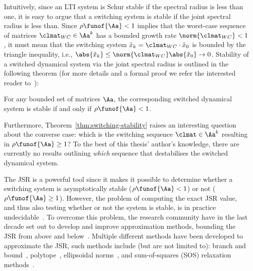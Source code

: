 Intuitively, since an LTI system is Schur stable if the spectral radius is less than one, it is easy to argue that a switching system is stable if the joint spectral radius is less than.
Since $\rho\funof{\Aa} < 1$ implies that the worst-case sequence of matrices $\clmat_{WC} \in \Aa^k$ has a bounded growth rate $\norm{\clmat_{WC}} < 1$, it must mean that the switching system $\tilde{x}_k = \clmat_{WC}\cdot \tilde{x}_0$ is bounded by the triangle inequality, i.e., $\abs{\tilde{x}_k} \leq \norm{\clmat_{WC}}\abs{\tilde{x}_0} \rightarrow 0$.
Stability of a switched dynamical system via the joint spectral radius is outlined in the following theorem (for more details and a formal proof we refer the interested reader to~\cite{Jungers:2009}): 
%
\begin{theorem}%
    \label{thm:switching-stability}%
    For any bounded set of matrices $\Aa$, the corresponding switched dynamical system is stable if and only if $\rho\funof{\Aa} < 1$.
\end{theorem}
%
Furthermore, Theorem~\ref{thm:switching-stability} raises an interesting question about the converse case: which is the switching sequence $\clmat \in \Aa^k$ resulting in $\rho\funof{\Aa} \geq 1$?
To the best of this thesis' author's knowledge, there are currently no results outlining \emph{which} sequence that destabilises the switched dynamical system.

The JSR is a powerful tool since it makes it possible to determine whether a switching system is asymptotically stable ($\rho\funof{\Aa} < 1$) or not ($\rho\funof{\Aa} \geq 1$).
However, the problem of computing the exact JSR value, and thus also testing whether or not the system is stable, is in practice undecidable~\cite{Blondel:2000}.
To overcome this problem, the research community have in the last decade set out to develop and improve approximation methods, bounding the JSR from above and below~\cite{Jungers:2009}.
Multiple different methods have been developed to approximate the JSR, such methods include (but are not limited to): branch and bound~\cite{Gripenberg:1996}, polytope~\cite{Protasov:1996}, ellipsoidal norms~\cite{Blondel:2005, John:2014}, and sum-of-squares (SOS) relaxation methods~\cite{Parrilo:2008, Wang:2021a, Wang:2021b}.

